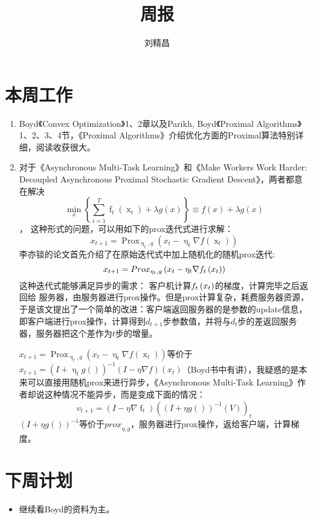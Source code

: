 \documentclass{ctexart}
\begin{document}
\title{周报}
\author{刘精昌}
\maketitle
\fangsong

\section*{本周工作}
\begin{enumerate}
  \item Boyd《Convex Optimization》1、2章以及Parikh, Boyd《Proximal Algorithms》1、2、3、4节，《Proximal Algorithms》介绍优化方面的Proximal算法特别详细，阅读收获很大。
  \item 对于《Asynchronous Multi-Task Learning》和《Make Workers Work Harder: Decoupled Asynchronous Proximal Stochastic Gradient Descent》，两者都意在解决\[\mathop {\min }\limits_x \left\{ {\sum\limits_{i = 1}^T {\mathop f\nolimits_t \left( {\mathop x\nolimits_t } \right) + \lambda g\left( x \right)} } \right\} \equiv f\left( x \right) + \lambda g\left( x \right)\]， 这种形式的问题，可以用如下的prox迭代式进行求解：
      \[{x_{t + 1}} = \mathop {Prox}\nolimits_{\mathop \eta \nolimits_t ,g} \left( {{x_t} - \mathop \eta \nolimits_t \nabla f\left( {\mathop x\nolimits_t } \right)} \right)\]
      李亦锬的论文首先介绍了在原始迭代式中加上随机化的随机prox迭代: \[{x_{t + 1}} = Pro{x_{{\eta _t},g}}\left( {{x_t} - {\eta _t}\nabla {f_t}\left( {{\rm{ }}{x_t}} \right)} \right)\]
      这种迭代式能够满足异步的需求： 客户机计算${{f_t}\left( {{\rm{ }}{x_t}} \right)}$的梯度，计算完毕之后返回给 服务器，由服务器进行prox操作。但是prox计算复杂，耗费服务器资源，于是该文提出了一个简单的改进：客户端返回服务器的是参数的update信息，即客户端进行prox操作，计算得到$d_{t+1}$步参数值，并将与$d_{t}$步的差返回服务器，服务器把这个差作为$t$步的增量。


      ${x_{t + 1}} = \mathop {Prox}\nolimits_{\mathop \eta \nolimits_t ,g} \left( {{x_t} - \mathop \eta \nolimits_t \nabla f\left( {\mathop x\nolimits_t } \right)} \right)$等价于${x_{t + 1}} = {\left( {I + \mathop \eta \nolimits_t g\left(  \right)} \right)^{ - 1}}\left( {I - \eta \nabla f} \right)\left( {{x_t}} \right)$（Boyd书中有讲），我疑惑的是本来可以直接用随机prox来进行异步，《Asynchronous Multi-Task Learning》作者却说这种情况不能异步，而是变成下面的情况：
      \[{v_{t + 1}} = \left( {I - \eta \nabla \mathop f\nolimits_t } \right){\left( {{{\left( {I + \eta g\left(  \right)} \right)}^{ - 1}}\left( V \right)} \right)_t}\]
      ${{{\left( {I + \eta g\left(  \right)} \right)}^{ - 1}}}$等价于${prox}_{\eta ,g}$，服务器进行prox操作，返给客户端，计算梯度。
\end{enumerate}

\section*{下周计划}
\begin{itemize}
  \item 继续看Boyd的资料为主。
\end{itemize}
\end{document}

